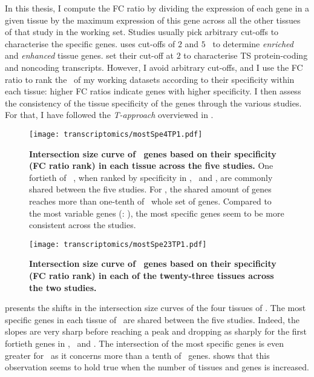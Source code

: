In this thesis,
I compute the FC ratio by dividing the expression
of each gene in a given tissue
by the maximum expression of this gene across all the other tissues of that study
in the working set.
Studies usually pick arbitrary cut-offs to characterise the specific genes.
\citet{Uhlen2015} uses cut-offs of $2$ and $5$ \FPKM\
to determine \emph{enriched} and \emph{enhanced} tissue genes.
\citet{Zhu2016-xo} set their cut-off at $2$ to characterise \gls{TS} protein-coding
and noncoding transcripts.
However,
I avoid arbitrary cut-offs, and
I use the FC ratio to rank the \pcgs\ of my working datasets according
to their specificity within each tissue:
higher FC ratios indicate genes with higher specificity.
I then assess the consistency of the tissue specificity of the genes through the
various studies.
For that, I have followed the \emph{T-approach} overviewed in .

\begin{figure}[!htbp]
    \texttt{[image: transcriptomics/mostSpe4TP1.pdf]}\centering
    \vspace{-0.1in}
    \caption[Intersection size curve of \setOne\ genes based on their FC ratio
    rank in each tissue across the five studies]{\label{fig:mostSpe4T}\textbf{Intersection
    size curve of \setOne\ genes based on their specificity (FC ratio rank)
    in each tissue across the five studies.}
    One fortieth of \setOne\ \pcgs,
    when ranked by specificity in \heart, \kidney\ and \liver,
    are commonly shared between the five studies.
    For \testis, the shared amount of genes reaches more than one-tenth of \setOne\
    whole set of genes.
    Compared to the most variable genes (\Cref{fig:cvEvol5DF}:
    ),
    the most specific genes seem to be more consistent across the studies.
    }
\end{figure}

\begin{figure}[!htbp]
    \texttt{[image: transcriptomics/mostSpe23TP1.pdf]}\centering
    \vspace{-0.1in}
    \caption[Intersection size curve of \setTwo\ genes based on their FC ratio
    rank in each tissue across the two studies]{\label{fig:mostSpe23T}\textbf{Intersection
    size curve of \setTwo\ genes based on their specificity (FC ratio rank)
    in each of the twenty-three tissues across the two studies.}
    }
\end{figure}

 presents the shifts in the intersection size curves of the
four tissues of \setOne.
The most specific genes in each tissue of \setOne\ are shared between the
five studies.
Indeed, the slopes are very sharp before reaching a peak and dropping as sharply
for the first fortieth genes in \heart, \kidney\ and \liver.
The intersection of the most specific genes is even greater for \testis\ as
it concerns more than a tenth of \setOne\ genes.
\Cref{fig:mostSpe23T} shows that this observation seems to hold true
when the number of tissues and genes is increased.

